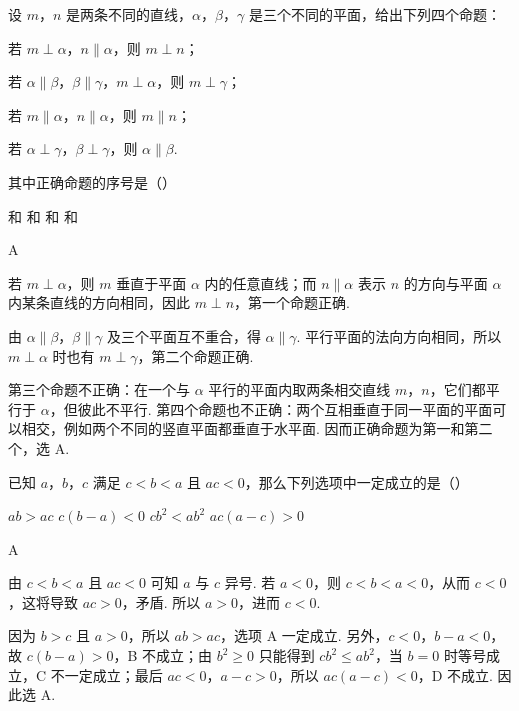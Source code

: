 \begin{problem}
设 \(m\)，\(n\) 是两条不同的直线，\(\alpha\)，\(\beta\)，\(\gamma\) 是三个不同的平面，给出下列四个命题：

\begin{circlelist}
\item 若 \(m\perp\alpha\)，\(n\parallel\alpha\)，则 \(m\perp n\)；
\item 若 \(\alpha\parallel\beta\)，\(\beta\parallel\gamma\)，\(m\perp\alpha\)，则 \(m\perp\gamma\)；
\item 若 \(m\parallel\alpha\)，\(n\parallel\alpha\)，则 \(m\parallel n\)；
\item 若 \(\alpha\perp\gamma\)，\(\beta\perp\gamma\)，则 \(\alpha\parallel\beta\).
\end{circlelist}

其中正确命题的序号是（\quad）

\choices
    {和}
    {和}
    {和}
    {和}
\begin{answer}
A
\end{answer}

\begin{solution}
若 \(m\perp\alpha\)，则 \(m\) 垂直于平面 \(\alpha\) 内的任意直线；而 \(n\parallel\alpha\) 表示 \(n\) 的方向与平面 \(\alpha\) 内某条直线的方向相同，因此 \(m\perp n\)，第一个命题正确.

由 \(\alpha\parallel\beta\)，\(\beta\parallel\gamma\) 及三个平面互不重合，得 \(\alpha\parallel\gamma\). 平行平面的法向方向相同，所以 \(m\perp\alpha\) 时也有 \(m\perp\gamma\)，第二个命题正确.

第三个命题不正确：在一个与 \(\alpha\) 平行的平面内取两条相交直线 \(m\)，\(n\)，它们都平行于 \(\alpha\)，但彼此不平行. 第四个命题也不正确：两个互相垂直于同一平面的平面可以相交，例如两个不同的竖直平面都垂直于水平面. 因而正确命题为第一和第二个，选 A.
\end{solution}

\end{problem}

\begin{problem}
已知 \(a\)，\(b\)，\(c\) 满足 \(c<b<a\) 且 \(ac<0\)，那么下列选项中一定成立的是（\quad）

\choices
    {\(ab>ac\)}
    {\(c(b-a)<0\)}
    {\(cb^{2}<ab^{2}\)}
    {\(ac(a-c)>0\)}
\begin{answer}
A
\end{answer}

\begin{solution}
由 \(c<b<a\) 且 \(ac<0\) 可知 \(a\) 与 \(c\) 异号. 若 \(a<0\)，则 \(c<b<a<0\)，从而 \(c<0\)，这将导致 \(ac>0\)，矛盾. 所以 \(a>0\)，进而 \(c<0\).

因为 \(b>c\) 且 \(a>0\)，所以 \(ab>ac\)，选项 A 一定成立. 另外，\(c<0\)，\(b-a<0\)，故 \(c(b-a)>0\)，B 不成立；由 \(b^{2}\geqslant0\) 只能得到 \(cb^{2}\leqslant ab^{2}\)，当 \(b=0\) 时等号成立，C 不一定成立；最后 \(ac<0\)，\(a-c>0\)，所以 \(ac(a-c)<0\)，D 不成立. 因此选 A.
\end{solution}

\end{problem}

